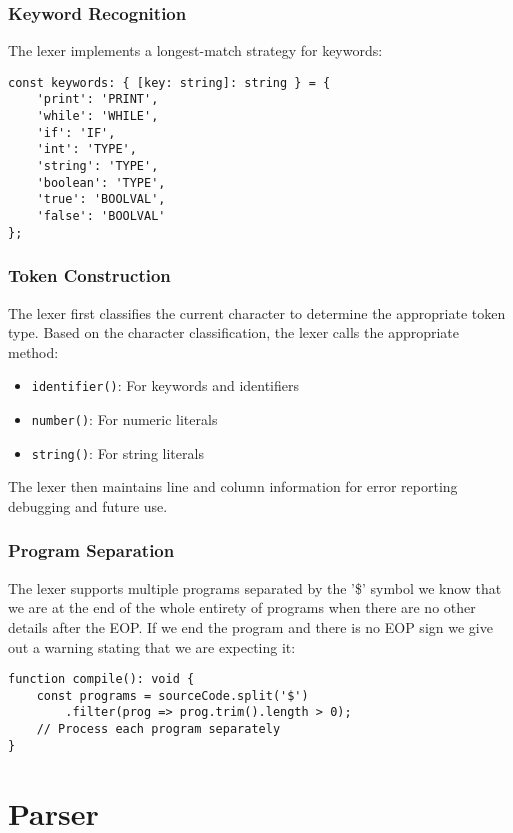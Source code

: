 \documentclass[12pt]{article}
\begin{document}
\subsubsection{Keyword Recognition}
The lexer implements a longest-match strategy for keywords:

\begin{lstlisting}
const keywords: { [key: string]: string } = {
    'print': 'PRINT',
    'while': 'WHILE',
    'if': 'IF',
    'int': 'TYPE',
    'string': 'TYPE',
    'boolean': 'TYPE',
    'true': 'BOOLVAL',
    'false': 'BOOLVAL'
};
\end{lstlisting}

\subsubsection{Token Construction}
The lexer first classifies the current character to determine the appropriate token type. Based on the character classification, the lexer calls the appropriate method:
\begin{itemize}
    \item \texttt{identifier()}: For keywords and identifiers
    \item \texttt{number()}: For numeric literals
    \item \texttt{string()}: For string literals
\end{itemize}

The lexer then maintains line and column information for error reporting debugging and future use.

\subsubsection{Program Separation}
The lexer supports multiple programs separated by the '\$' symbol we know that we are at the end of the whole entirety of programs when there are no other details after the EOP. If we end the program and there is no EOP sign we give out a warning stating that we are expecting it:

\begin{lstlisting}
function compile(): void {
    const programs = sourceCode.split('$')
        .filter(prog => prog.trim().length > 0);
    // Process each program separately
}
\end{lstlisting}

\section{Parser}
\end{document}
